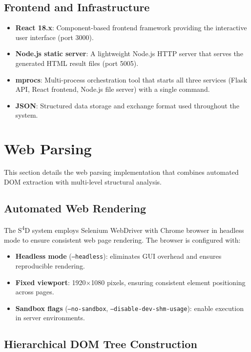 \subsection{Frontend and Infrastructure}

\begin{itemize}
    \item \textbf{React 18.x}: Component-based frontend framework providing the interactive user interface (port 3000).
    \item \textbf{Node.js static server}: A lightweight Node.js HTTP server that serves the generated HTML result files (port 5005).
    \item \textbf{mprocs}: Multi-process orchestration tool that starts all three services (Flask API, React frontend, Node.js file server) with a single command.
    \item \textbf{JSON}: Structured data storage and exchange format used throughout the system.
\end{itemize}

\section{Web Parsing}
\label{sec:web-parsing}

This section details the web parsing implementation that combines automated DOM extraction with multi-level structural analysis.

\subsection{Automated Web Rendering}

The S\textsuperscript{4}D system employs Selenium WebDriver with Chrome browser in headless mode to ensure consistent web page rendering. The browser is configured with:

\begin{itemize}
    \item \textbf{Headless mode} (\texttt{--headless}): eliminates GUI overhead and ensures reproducible rendering.
    \item \textbf{Fixed viewport}: 1920$\times$1080 pixels, ensuring consistent element positioning across pages.
    \item \textbf{Sandbox flags} (\texttt{--no-sandbox}, \texttt{--disable-dev-shm-usage}): enable execution in server environments.
\end{itemize}

\subsection{Hierarchical DOM Tree Construction}

